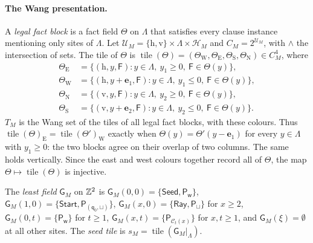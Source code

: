 \paragraph{The Wang presentation.} A \emph{legal fact block} is a fact field $\Theta$ on $\Lambda$ that satisfies every clause instance mentioning only sites of $\Lambda$. Let $\mathcal U_M=\{\mathrm h,\mathrm v\}\times\Lambda\times\mathcal H_M$ and $C_M=2^{\mathcal U_M}$, with $\wedge$ the intersection of sets. The tile of $\Theta$ is $\operatorname{tile}(\Theta)=(\Theta_{\mathrm W},\Theta_{\mathrm E},\Theta_{\mathrm S},\Theta_{\mathrm N})\in C_M^4$, where
\[
\begin{aligned}
\Theta_{\mathrm E}&=\{(\mathrm h,y,\mathsf F):y\in\Lambda,\ y_1\ge0,\ \mathsf F\in\Theta(y)\},\\
\Theta_{\mathrm W}&=\{(\mathrm h,y+\mathbf e_1,\mathsf F):y\in\Lambda,\ y_1\le0,\ \mathsf F\in\Theta(y)\},\\
\Theta_{\mathrm N}&=\{(\mathrm v,y,\mathsf F):y\in\Lambda,\ y_2\ge0,\ \mathsf F\in\Theta(y)\},\\
\Theta_{\mathrm S}&=\{(\mathrm v,y+\mathbf e_2,\mathsf F):y\in\Lambda,\ y_2\le0,\ \mathsf F\in\Theta(y)\}.
\end{aligned}
\]
$T_M$ is the Wang set of the tiles of all legal fact blocks, with these colours. Thus $\operatorname{tile}(\Theta)_{\mathrm E}=\operatorname{tile}(\Theta')_{\mathrm W}$ exactly when $\Theta(y)=\Theta'(y-\mathbf e_1)$ for every $y\in\Lambda$ with $y_1\ge0$: the two blocks agree on their overlap of two columns. The same holds vertically. Since the east and west colours together record all of $\Theta$, the map $\Theta\mapsto\operatorname{tile}(\Theta)$ is injective.

The \emph{least field} $\mathsf G_M$ on $\mathbb{Z}^2$ is $\mathsf G_M(0,0)=\{\mathsf{Seed},\mathsf P_{\mathsf w}\}$, $\mathsf G_M(1,0)=\{\mathsf{Start},\mathsf P_{(\mathsf q_0,\sqcup)}\}$, $\mathsf G_M(x,0)=\{\mathsf{Ray},\mathsf P_\sqcup\}$ for $x\ge2$, $\mathsf G_M(0,t)=\{\mathsf P_{\mathsf w}\}$ for $t\ge1$, $\mathsf G_M(x,t)=\{\mathsf P_{\mathcal C_t(x)}\}$ for $x,t\ge1$, and $\mathsf G_M(\xi)=\emptyset$ at all other sites. The \emph{seed tile} is $s_M=\operatorname{tile}(\mathsf G_M|_\Lambda)$.

